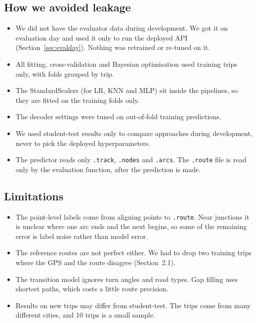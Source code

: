 \documentclass[11pt,a4paper]{article}
\newcommand{\code}[1]{\texttt{\small #1}}
\begin{document}
\subsection{How we avoided leakage}
\begin{itemize}
  \item We did not have the evaluator data during development. We got it on evaluation day and used it only
        to run the deployed API (Section~\ref{sec:evalday}). Nothing was retrained or re-tuned on it.
  \item All fitting, cross-validation and Bayesian optimisation used training trips only, with folds grouped
        by trip.
  \item The StandardScalers (for LR, KNN and MLP) sit inside the pipelines, so they are fitted on the
        training folds only.
  \item The decoder settings were tuned on out-of-fold training predictions.
  \item We used student-test results only to compare approaches during development, never to pick the
        deployed hyperparameters.
  \item The predictor reads only \code{.track}, \code{.nodes} and \code{.arcs}. The \code{.route} file is
        read only by the evaluation function, after the prediction is made.
\end{itemize}

\subsection{Limitations}
\begin{itemize}
  \item The point-level labels come from aligning points to \code{.route}. Near junctions it is unclear
        where one arc ends and the next begins, so some of the remaining error is label noise rather than
        model error.
  \item The reference routes are not perfect either. We had to drop two training trips where the GPS and
        the route disagree (Section~2.1).
  \item The transition model ignores turn angles and road types. Gap filling uses shortest paths, which
        costs a little route precision.
  \item Results on new trips may differ from student-test. The trips come from many different cities, and
        10 trips is a small sample.
\end{itemize}
\end{document}

